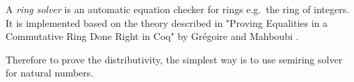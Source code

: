 \begin{remark}
A \emph{ring solver} is an automatic equation checker for rings e.g.\ the
ring of integers. It is implemented based on the theory described in
"Proving Equalities in a Commutative Ring Done Right in Coq" by
Grégoire and Mahboubi \cite{gregoire2005proving}.
\end{remark}



Therefore to prove the distributivity, the
simplest way is to use semiring
solver for natural numbers. 


\begin{code}
\\
\> \AgdaSymbol{:} \<[9]%
\>[9]\AgdaFunction{\_*\_}  \AgdaFunction{\_+\_}\<%
\\
\> \AgdaSymbol{(} \AgdaInductiveConstructor{,} \AgdaSymbol{)} \AgdaSymbol{(} \AgdaInductiveConstructor{,} \AgdaSymbol{)} \AgdaSymbol{(} \AgdaInductiveConstructor{,} \AgdaSymbol{)} \AgdaSymbol{=}   \<[40]%
\>[40]\<%
\\
\>[0]\<[2]%
\>[2]         \AgdaFunction{:*} \AgdaSymbol{(} \AgdaFunction{:+} \AgdaSymbol{)} \AgdaFunction{:+}  \AgdaFunction{:*} \AgdaSymbol{(} \AgdaFunction{:+} \AgdaSymbol{)} \AgdaFunction{:+}\<%
\\
\>[2]\<[6]%
\>[6]\AgdaSymbol{(} \AgdaFunction{:*}  \AgdaFunction{:+}  \AgdaFunction{:*}  \AgdaFunction{:+} \AgdaSymbol{(} \AgdaFunction{:*}  \AgdaFunction{:+}  \AgdaFunction{:*} \AgdaSymbol{))}\<%
\\
\>[2]\<[6]%
\>[6]\AgdaFunction{:=}\<%
\\
\>[2]\<[6]%
\>[6] \AgdaFunction{:*}  \AgdaFunction{:+}  \AgdaFunction{:*}  \AgdaFunction{:+} \AgdaSymbol{(} \AgdaFunction{:*}  \AgdaFunction{:+}  \AgdaFunction{:*} \AgdaSymbol{)} \AgdaFunction{:+}\<%
\\
\>[2]\<[6]%
\>[6]\AgdaSymbol{(} \AgdaFunction{:*} \AgdaSymbol{(} \AgdaFunction{:+} \AgdaSymbol{)} \AgdaFunction{:+}  \AgdaFunction{:*} \AgdaSymbol{(} \AgdaFunction{:+} \AgdaSymbol{)))}       \<%
\\
\end{code}

